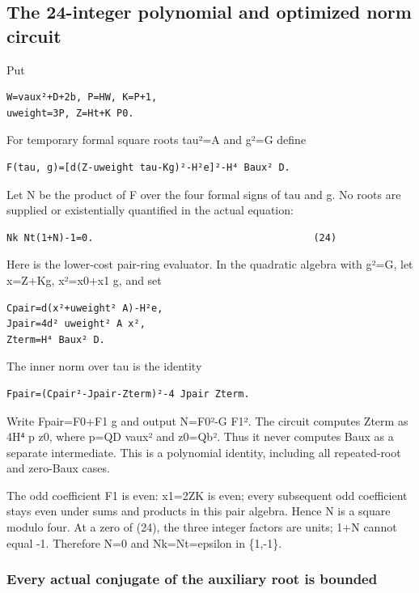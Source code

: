 \documentclass[
  10pt,
]{article}
\begin{document}
\subsection{The 24-integer polynomial and optimized norm
circuit}\label{the-24-integer-polynomial-and-optimized-norm-circuit}

Put

\begin{verbatim}
W=vaux²+D+2b, P=HW, K=P+1,
uweight=3P, Z=Ht+K P0.
\end{verbatim}

For temporary formal square roots tau²=A and g²=G define

\begin{verbatim}
F(tau, g)=[d(Z-uweight tau-Kg)²-H²e]²-H⁴ Baux² D.
\end{verbatim}

Let N be the product of F over the four formal signs of tau and g. No
roots are supplied or existentially quantified in the actual equation:

\begin{verbatim}
Nk Nt(1+N)-1=0.                                      (24)
\end{verbatim}

Here is the lower-cost pair-ring evaluator. In the quadratic algebra
with g²=G, let x=Z+Kg, x²=x0+x1 g, and set

\begin{verbatim}
Cpair=d(x²+uweight² A)-H²e,
Jpair=4d² uweight² A x²,
Zterm=H⁴ Baux² D.
\end{verbatim}

The inner norm over tau is the identity

\begin{verbatim}
Fpair=(Cpair²-Jpair-Zterm)²-4 Jpair Zterm.
\end{verbatim}

Write Fpair=F0+F1 g and output N=F0²-G F1². The circuit computes Zterm
as 4H⁴ p z0, where p=QD vaux² and z0=Qb². Thus it never computes Baux as
a separate intermediate. This is a polynomial identity, including all
repeated-root and zero-Baux cases.

The odd coefficient F1 is even: x1=2ZK is even; every subsequent odd
coefficient stays even under sums and products in this pair algebra.
Hence N is a square modulo four. At a zero of (24), the three integer
factors are units; 1+N cannot equal -1. Therefore N=0 and Nk=Nt=epsilon
in \{1,-1\}.

\subsubsection{Every actual conjugate of the auxiliary root is
bounded}\label{every-actual-conjugate-of-the-auxiliary-root-is-bounded}
\end{document}
